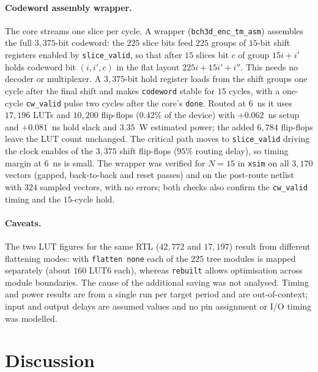 \documentclass[11pt,a4paper]{article}
\begin{document}
\paragraph{Codeword assembly wrapper.} The core streams one slice per cycle. A wrapper (\texttt{bch3d\_enc\_tm\_asm}) assembles the full $3,375$-bit codeword: the $225$ slice bits feed $225$ groups of $15$-bit shift registers enabled by \texttt{slice\_valid}, so that after $15$ slices bit $c$ of group $15i+i'$ holds codeword bit $(i,i',c)$ in the flat layout $225i+15i'+i''$. This needs no decoder or multiplexer. A $3,375$-bit hold register loads from the shift groups one cycle after the final shift and makes \texttt{codeword} stable for $15$ cycles, with a one-cycle \texttt{cw\_valid} pulse two cycles after the core's \texttt{done}. Routed at $6$~ns it uses $17,196$ LUTs and $10,200$ flip-flops ($0.42\%$ of the device) with $+0.062$~ns setup and $+0.081$~ns hold slack and $3.35$~W estimated power; the added $6,784$ flip-flops leave the LUT count unchanged. The critical path moves to \texttt{slice\_valid} driving the clock enables of the $3,375$ shift flip-flops ($95\%$ routing delay), so timing margin at $6$~ns is small. The wrapper was verified for $N=15$ in \texttt{xsim} on all $3,170$ vectors (gapped, back-to-back and reset passes) and on the post-route netlist with $324$ sampled vectors, with no errors; both checks also confirm the \texttt{cw\_valid} timing and the $15$-cycle hold.

\paragraph{Caveats.} The two LUT figures for the same RTL ($42,772$ and $17,197$) result from different flattening modes: with \texttt{flatten none} each of the $225$ tree modules is mapped separately (about $160$ LUT6 each), whereas \texttt{rebuilt} allows optimisation across module boundaries. The cause of the additional saving was not analysed. Timing and power results are from a single run per target period and are out-of-context; input and output delays are assumed values and no pin assignment or I/O timing was modelled.

\section{Discussion}
\end{document}
